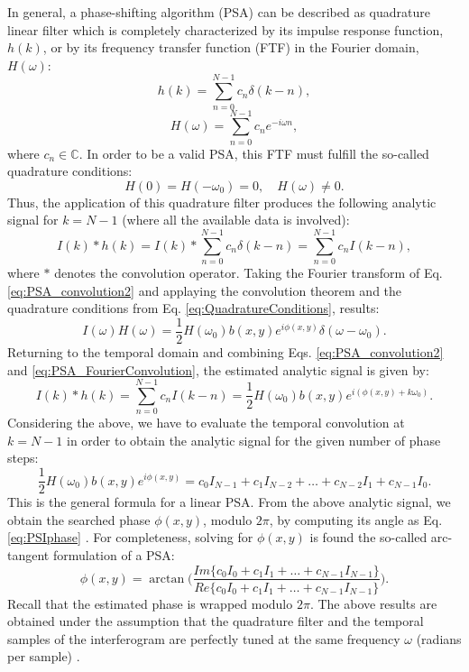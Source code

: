 In general, a phase-shifting algorithm (PSA) can be described as quadrature linear
filter which is completely characterized by its impulse response function, $h(k)$,
or by its frequency transfer function (FTF) in the Fourier domain, $H(\omega)$:
\begin{equation}
 h(k)=\sum^{N-1}_{n=0} c_n \delta(k-n),
\end{equation}
\begin{equation}
 H(\omega)=\sum^{N-1}_{n=0} c_n e^{-i\omega n},
\end{equation}
where ${c_n} \in \mathbb{C}$. In order to be a valid PSA, this FTF must fulfill
the so-called quadrature conditions:
\begin{equation}\label{eq:QuadratureConditions}
 H(0)=H(-\omega_0)=0, \quad H(\omega)\not=0.
\end{equation}
Thus, the application of this quadrature filter produces the following analytic
signal for $k = N-1$ (where all the available data is involved):
\begin{equation}\label{eq:PSA_convolution2}
 I(k)*h(k)=I(k)*\sum^{N-1}_{n=0} c_n \delta(k-n) = \sum^{N-1}_{n=0} c_n I(k-n),
\end{equation}
where $*$ denotes the convolution operator. Taking the Fourier transform of Eq. 
\eqref{eq:PSA_convolution2} and applaying the convolution theorem and the 
quadrature conditions from Eq. \eqref{eq:QuadratureConditions}, results:
\begin{equation}\label{eq:PSA_FourierConvolution}
 I(\omega)H(\omega)= \frac{1}{2} H(\omega_0)b(x,y) e^{i\phi(x,y)} \delta(\omega-
\omega_0).
\end{equation}
Returning to the temporal domain and combining Eqs. 
\eqref{eq:PSA_convolution2} and \eqref{eq:PSA_FourierConvolution}, the estimated 
analytic signal is given by:
\begin{equation}
 I(k)*h(k)= \sum^{N-1}_{n=0} c_n I(k-n) = \frac{1}{2} H(\omega_0)b(x,y) 
e^{i(\phi(x,y)+k\omega_0)}.
\end{equation}
Considering the above, we have to evaluate the temporal convolution at $k=N-1$ in
order to obtain the analytic signal for the given number of phase steps:
\begin{equation}
  \frac{1}{2} H(\omega_0)b(x,y) e^{i\phi(x,y)} = c_0 I_{N-1} + c_1 I_{N-2}+ \dots 
  + c_{N-2} I_{1}+ c_{N-1} I_{0}.
\end{equation}
This is the general formula for a linear PSA.
From the above analytic signal, we obtain the searched phase $\phi(x,y)$, modulo
$2\pi$, by computing its angle as Eq. \eqref{eq:PSIphase} \cite{Surrel:96,
Wyant:75,Kujawinska2006}. 
For completeness, 
solving for $\phi(x,y)$ is found the so-called arc-tangent formulation of a PSA:
\begin{equation}\label{eq:PhiPSA}
 \phi(x,y) = \arctan \Bigg(\frac{Im\{c_0I_0+c_1I_1 + \dots + c_{N-1}
I_{N-1}\}}{Re\{c_0I_0+c_1I_1 + \dots + c_{N-1} I_{N-1}\}}  \Bigg).
\end{equation}
Recall that the estimated phase is wrapped modulo $2 \pi$.
The above results are obtained under the assumption that the quadrature filter
and the temporal samples of the interferogram are perfectly tuned at the same
frequency $\omega$ (radians per sample) \cite{Gonzalez:11}.

